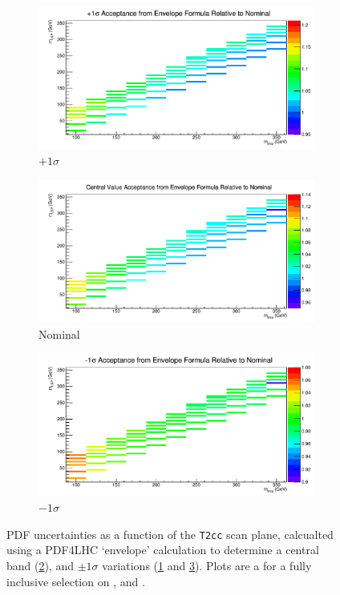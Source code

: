 \begin{figure}[ht!]
  \centering
  \begin{subfigure}[b]{0.6\textwidth}
    \includegraphics[width=\textwidth]{Figs/sms/t2cc/v37/systs/acc_pSigmaRel_m0_m12}
    \caption{$+1\sigma$}
    \label{fig:sms-pdf-up-t2cc}
  \end{subfigure}
  \begin{subfigure}[b]{0.6\textwidth}
    \includegraphics[width=\textwidth]{Figs/sms/t2cc/v37/systs/acc_cvRel_m0_m12}
    \caption{Nominal}
    \label{fig:sms-pdf-nominal-t2cc}
  \end{subfigure}
  \begin{subfigure}[b]{0.6\textwidth}
    \includegraphics[width=\textwidth]{Figs/sms/t2cc/v37/systs/acc_mSigmaRel_m0_m12}
    \caption{$-1\sigma$}
    \label{fig:sms-pdf-down-t2cc}
  \end{subfigure}
  \caption{PDF uncertainties as a function of the \texttt{T2cc} scan plane,
  calcualted using a PDF4LHC `envelope' calculation to determine a central band
  (\ref{fig:sms-pdf-nominal-t2cc}), and $\pm1\sigma$ variations
  (\ref{fig:sms-pdf-up-t2cc} and \ref{fig:sms-pdf-down-t2cc}). Plots are a for
  a fully inclusive selection on \HT, \nj and \nb.}
  \label{fig:sms-pdf-t2cc}
\end{figure}


